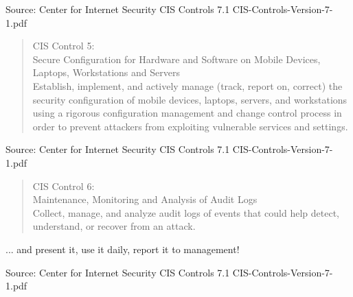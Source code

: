 \documentclass[Screen16to9,17pt]{foils}
\begin{document}
\begin{list1}
\item
\item
\item
\item
\end{list1}

Source: Center for Internet Security CIS Controls 7.1 CIS-Controls-Version-7-1.pdf


\begin{quote}
CIS Control 5:\\
Secure Configuration for Hardware and Software on Mobile Devices, Laptops, Workstations and Servers\\
Establish, implement, and actively manage (track, report on, correct) the security configuration of mobile devices, laptops, servers, and workstations using a rigorous configuration management and change control process in order to prevent attackers from exploiting vulnerable services and settings.
\end{quote}

\begin{list1}
\item
\item
\item
\item
\end{list1}

Source: Center for Internet Security CIS Controls 7.1 CIS-Controls-Version-7-1.pdf



\begin{quote}
CIS Control 6:\\
Maintenance, Monitoring and Analysis of Audit Logs\\
Collect, manage, and analyze audit logs of events that could help detect, understand, or recover from an attack.
\end{quote}

\begin{list1}
\item ... and present it, use it daily, report it to management!
\item
\item
\item
\end{list1}

Source: Center for Internet Security CIS Controls 7.1 CIS-Controls-Version-7-1.pdf
\end{document}
